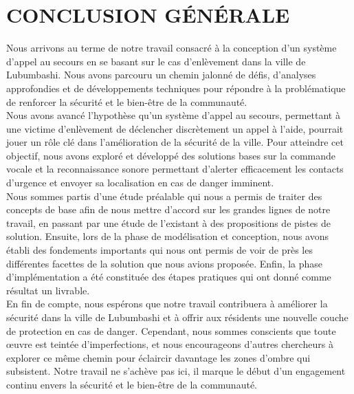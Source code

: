 \chapter*{CONCLUSION GÉNÉRALE}
\justifying
\large
\setlength{\parindent}{2.5em}
Nous arrivons au terme de notre travail consacré à la conception d'un système d’appel au secours en se basant sur le cas d'enlèvement dans la ville de Lubumbashi. Nous avons parcouru un chemin jalonné de défis, d'analyses approfondies et de développements techniques pour répondre à la problématique de renforcer la sécurité et le bien-être de la communauté.\\

Nous avons avancé l'hypothèse qu'un système d'appel au secours, permettant à une victime d'enlèvement de déclencher discrètement un appel à l'aide, pourrait jouer un rôle clé dans l'amélioration de la sécurité de la ville. Pour atteindre cet objectif, nous avons exploré et développé des solutions bases sur la commande vocale et la reconnaissance sonore permettant d'alerter efficacement les contacts d'urgence et envoyer sa localisation en cas de danger imminent.\\

Nous sommes partis d’une étude préalable qui nous a permis de traiter des concepts de base afin de nous mettre d'accord sur les grandes lignes de notre travail, en passant par une étude de l’existant à des propositions de pistes de solution. Ensuite, lors de la phase de modélisation et conception, nous avons établi des fondements importants qui nous ont permis de voir de près les différentes facettes de la solution que nous avions proposée. Enfin, la phase d’implémentation a été constituée des étapes pratiques qui ont donné comme résultat un livrable.\\

En fin de compte, nous espérons que notre travail contribuera à améliorer la sécurité dans la ville de Lubumbashi et à offrir aux résidents une nouvelle couche de protection en cas de danger. Cependant, nous sommes conscients que toute œuvre est teintée d'imperfections, et nous encourageons d'autres chercheurs à explorer ce même chemin pour éclaircir davantage les zones d'ombre qui subsistent.
Notre travail ne s'achève pas ici, il marque le début d'un engagement continu envers la sécurité et le bien-être de la communauté.
